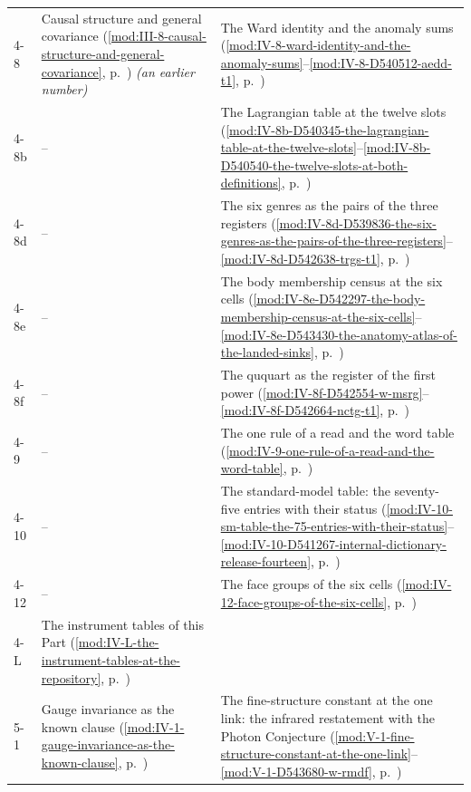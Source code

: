 {\begin{longtable}{p{11mm}p{70mm}p{60mm}}
4-8 & Causal structure and general covariance (\ref{mod:III-8-causal-structure-and-general-covariance}, p.~\pageref{mod:III-8-causal-structure-and-general-covariance}) \emph{(an earlier number)} & The Ward identity and the anomaly sums (\ref{mod:IV-8-ward-identity-and-the-anomaly-sums}--\ref{mod:IV-8-D540512-aedd-t1}, p.~\pageref{mod:IV-8-ward-identity-and-the-anomaly-sums}) \\
4-8b & -- & The Lagrangian table at the twelve slots (\ref{mod:IV-8b-D540345-the-lagrangian-table-at-the-twelve-slots}--\ref{mod:IV-8b-D540540-the-twelve-slots-at-both-definitions}, p.~\pageref{mod:IV-8b-D540345-the-lagrangian-table-at-the-twelve-slots}) \\
4-8d & -- & The six genres as the pairs of the three registers (\ref{mod:IV-8d-D539836-the-six-genres-as-the-pairs-of-the-three-registers}--\ref{mod:IV-8d-D542638-trgs-t1}, p.~\pageref{mod:IV-8d-D539836-the-six-genres-as-the-pairs-of-the-three-registers}) \\
4-8e & -- & The body membership census at the six cells (\ref{mod:IV-8e-D542297-the-body-membership-census-at-the-six-cells}--\ref{mod:IV-8e-D543430-the-anatomy-atlas-of-the-landed-sinks}, p.~\pageref{mod:IV-8e-D542297-the-body-membership-census-at-the-six-cells}) \\
4-8f & -- & The ququart as the register of the first power (\ref{mod:IV-8f-D542554-w-msrg}--\ref{mod:IV-8f-D542664-nctg-t1}, p.~\pageref{mod:IV-8f-D542554-w-msrg}) \\
4-9 & -- & The one rule of a read and the word table (\ref{mod:IV-9-one-rule-of-a-read-and-the-word-table}, p.~\pageref{mod:IV-9-one-rule-of-a-read-and-the-word-table}) \\
4-10 & -- & The standard-model table: the seventy-five entries with their status (\ref{mod:IV-10-sm-table-the-75-entries-with-their-status}--\ref{mod:IV-10-D541267-internal-dictionary-release-fourteen}, p.~\pageref{mod:IV-10-sm-table-the-75-entries-with-their-status}) \\
4-12 & -- & The face groups of the six cells (\ref{mod:IV-12-face-groups-of-the-six-cells}, p.~\pageref{mod:IV-12-face-groups-of-the-six-cells}) \\
4-L & The instrument tables of this Part (\ref{mod:IV-L-the-instrument-tables-at-the-repository}, p.~\pageref{mod:IV-L-the-instrument-tables-at-the-repository}) &  \\
5-1 & Gauge invariance as the known clause (\ref{mod:IV-1-gauge-invariance-as-the-known-clause}, p.~\pageref{mod:IV-1-gauge-invariance-as-the-known-clause}) & The fine-structure constant at the one link: the infrared restatement with the Photon Conjecture (\ref{mod:V-1-fine-structure-constant-at-the-one-link}--\ref{mod:V-1-D543680-w-rmdf}, p.~\pageref{mod:V-1-fine-structure-constant-at-the-one-link}) \\

\end{longtable}}
